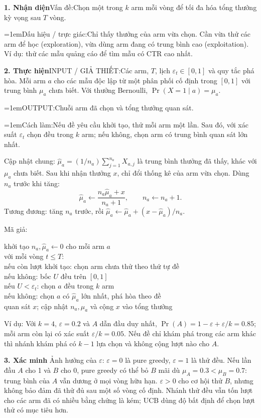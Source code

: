 \documentclass[10pt,a4paper,twocolumn]{article}
\makeatletter
\newcommand{\key}[1]{#1:\enspace}
\newcommand{\algfield}[2]{\par\noindent\hangindent=1em\relax#1:\enspace#2}
\newcommand{\unitheading}[2]{%
  \par\addvspace{1pt}\noindent\textbf{#1. #2}\enspace}
\newcommand{\unitverification}{\unitheading{3}{Xác minh}}
\newcommand{\unitfield}[4]{%
  \par\noindent\textbf{#1. #2}\enspace #3:\enspace #4}
\newcommand{\algsummary}[6]{%
  \begingroup\setlength{\parskip}{1pt}%
  \unitfield{1}{Nhận diện}{Vấn đề}{#1}%
  \algfield{Dấu hiệu / trực giác}{#2}%
  \if\relax\detokenize{#3}\relax\else\par\noindent#3\par\fi%
  \unitfield{2}{Thực hiện}{INPUT / GIẢ THIẾT}{#4}%
  \algfield{OUTPUT}{#5}%
  \algfield{Cách làm}{#6}\par\endgroup}
\newenvironment{algpseudo}{%
  \par\addvspace{2pt}\noindent
  \setlength{\parskip}{0pt}%
  Mã giả:\par\nobreak
  \begin{list}{}{\setlength{\leftmargin}{1em}\setlength{\topsep}{0pt}%
    \setlength{\partopsep}{0pt}\setlength{\parsep}{0pt}%
    \@beginparpenalty=10000\relax}%
  \item\relax
}{\end{list}\par\addvspace{3pt}}
\makeatother
\begin{document}
\algsummary{Chọn một trong $k$ arm mỗi vòng để tối đa hóa tổng thưởng kỳ vọng sau $T$ vòng.}{Chỉ thấy thưởng của arm vừa chọn. Cần vừa thử các arm để học (exploration), vừa dùng arm đang có trung bình cao (exploitation). Ví dụ: thử các mẫu quảng cáo để tìm mẫu có CTR cao nhất.}{}{Các arm, $T$, lịch $\varepsilon_t\in[0,1]$ và quy tắc phá hòa. Mỗi arm $a$ cho các mẫu độc lập từ một phân phối cố định trong $[0,1]$ với trung bình $\mu_a$ chưa biết. Với thưởng Bernoulli, $\Pr(X=1\mid a)=\mu_a$.}{Chuỗi arm đã chọn và tổng thưởng quan sát.}{Nếu đề yêu cầu khởi tạo, thử mỗi arm một lần. Sau đó, với xác suất $\varepsilon_t$ chọn đều trong $k$ arm; nếu không, chọn arm có trung bình quan sát lớn nhất.}

\key{Cập nhật chung} $\hat\mu_a=(1/n_a)\sum_{j=1}^{n_a}X_{a,j}$ là trung bình thưởng đã thấy, khác với $\mu_a$ chưa biết. Sau khi nhận thưởng $x$, chỉ đổi thống kê của arm vừa chọn. Dùng $n_a$ trước khi tăng:
\[
\hat\mu_a\gets\frac{n_a\hat\mu_a+x}{n_a+1},
\qquad n_a\gets n_a+1.
\]
Tương đương: tăng $n_a$ trước, rồi $\hat\mu_a\gets\hat\mu_a+(x-\hat\mu_a)/n_a$.

\begin{algpseudo}
khởi tạo $n_a,\hat\mu_a\gets0$ cho mỗi arm $a$\\
với mỗi vòng $t\le T$:\\
\quad nếu còn lượt khởi tạo: chọn arm chưa thử theo thứ tự đề\\
\quad nếu không: bốc $U$ đều trên $[0,1]$\\
\qquad nếu $U<\varepsilon_t$: chọn $a$ đều trong $k$ arm\\
\qquad nếu không: chọn $a$ có $\hat\mu_a$ lớn nhất, phá hòa theo đề\\
\quad quan sát $x$; cập nhật $n_a,\hat\mu_a$ và cộng $x$ vào tổng thưởng
\end{algpseudo}

\key{Ví dụ} Với $k=4$, $\varepsilon=0.2$ và $A$ dẫn đầu duy nhất, $\Pr(A)=1-\varepsilon+\varepsilon/k=0.85$; mỗi arm còn lại có xác suất $\varepsilon/k=0.05$. Nếu đề chỉ khám phá trong các arm khác thì nhánh khám phá có $k-1$ lựa chọn và không cộng lượt nào cho $A$.

\unitverification
\key{Ảnh hưởng của $\varepsilon$} $\varepsilon=0$ là pure greedy, $\varepsilon=1$ là thử đều. Nếu lần đầu $A$ cho 1 và $B$ cho 0, pure greedy có thể bỏ $B$ mãi dù $\mu_A=0.3<\mu_B=0.7$: trung bình của $A$ vẫn dương ở mọi vòng hữu hạn. $\varepsilon>0$ cho cơ hội thử $B$, nhưng không bảo đảm đã thử đủ sau một số vòng cố định. Nhánh thử đều vẫn tốn lượt cho các arm đã có nhiều bằng chứng là kém; UCB dùng độ bất định để chọn lượt thử có mục tiêu hơn.
\end{document}
